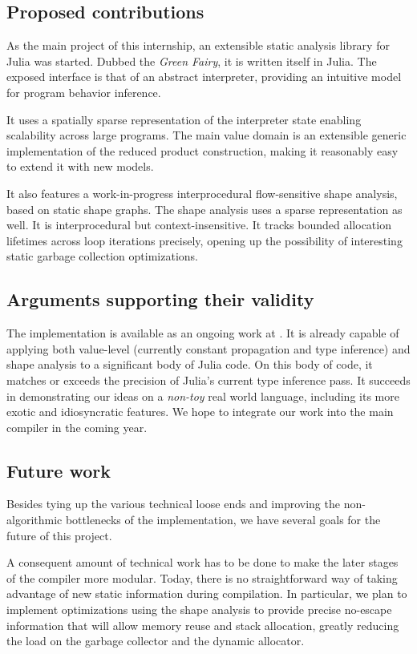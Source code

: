 \documentclass[11pt]{article}
\begin{document}
\subsection*{Proposed contributions}

As the main project of this internship, an extensible static analysis library for Julia was started. Dubbed the \emph{Green Fairy}, it is written itself in Julia. The exposed interface is that of an abstract interpreter, providing an intuitive model for program behavior inference.

It uses a spatially sparse representation of the interpreter state enabling scalability across large programs. The main value domain is an extensible generic implementation of the reduced product construction, making it reasonably easy to extend it with new models.

It also features a work-in-progress interprocedural flow-sensitive shape analysis, based on static shape graphs\cite{ssc}. The shape analysis uses a sparse representation as well. It is interprocedural but context-insensitive. It tracks bounded allocation lifetimes across loop iterations precisely, opening up the possibility of interesting static garbage collection optimizations.

\subsection*{Arguments supporting their validity}

The implementation is available as an ongoing work at \cite{gf-web}. It is already capable of applying both value-level (currently constant propagation and type inference) and shape analysis to a significant body of Julia code.
On this body of code, it matches or exceeds the precision of Julia's current type inference pass.
It succeeds in demonstrating our ideas on a \emph{non-toy} real world language, including its more exotic and idiosyncratic features.
We hope to integrate our work into the main compiler in the coming year.

\subsection*{Future work}

Besides tying up the various technical loose ends and improving the non-algorithmic bottlenecks of the implementation, we have several goals for the future of this project.

A consequent amount of technical work has to be done to make the later stages of the compiler more modular.
Today, there is no straightforward way of taking advantage of new static information during compilation.
In particular, we plan to implement optimizations using the shape analysis to provide precise no-escape information that will allow memory reuse and stack allocation, greatly reducing the load on the garbage collector and the dynamic allocator.
\end{document}
